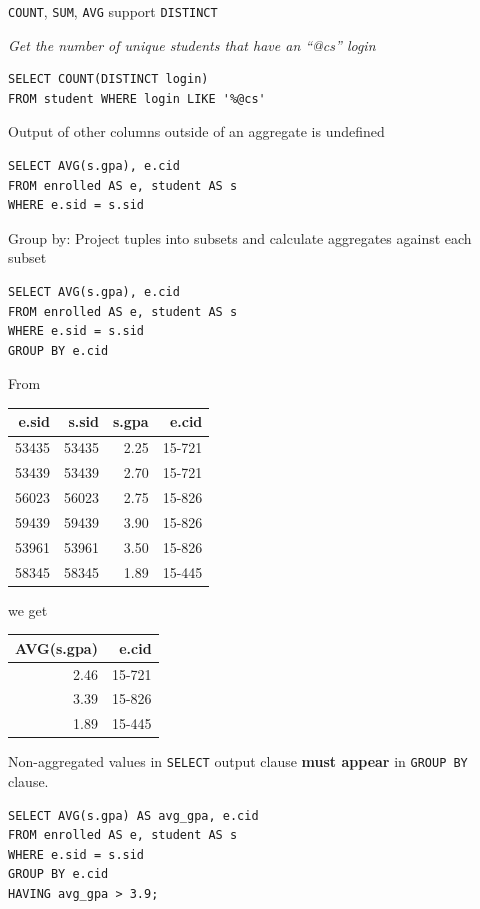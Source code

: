 \documentclass[11pt]{article}
\begin{document}
\texttt{COUNT}, \texttt{SUM}, \texttt{AVG} support \texttt{DISTINCT}

\emph{Get the number of unique students that have an ``@cs'' login}
\begin{verbatim}
SELECT COUNT(DISTINCT login)
FROM student WHERE login LIKE '%@cs'
\end{verbatim}

Output of other columns outside of an aggregate is undefined
\begin{verbatim}
SELECT AVG(s.gpa), e.cid
FROM enrolled AS e, student AS s
WHERE e.sid = s.sid
\end{verbatim}

Group by: Project tuples into subsets and calculate aggregates against each subset
\begin{verbatim}
SELECT AVG(s.gpa), e.cid
FROM enrolled AS e, student AS s
WHERE e.sid = s.sid
GROUP BY e.cid
\end{verbatim}

From
\begin{center}
\begin{tabular}{rrrr}
e.sid & s.sid & s.gpa & e.cid\\
\hline
53435 & 53435 & 2.25 & 15-721\\
53439 & 53439 & 2.70 & 15-721\\
56023 & 56023 & 2.75 & 15-826\\
59439 & 59439 & 3.90 & 15-826\\
53961 & 53961 & 3.50 & 15-826\\
58345 & 58345 & 1.89 & 15-445\\
\end{tabular}
\end{center}
we get
\begin{center}
\begin{tabular}{rr}
AVG(s.gpa) & e.cid\\
\hline
2.46 & 15-721\\
3.39 & 15-826\\
1.89 & 15-445\\
\end{tabular}
\end{center}

Non-aggregated values in \texttt{SELECT} output clause \textbf{must appear} in \texttt{GROUP BY} clause.
\begin{verbatim}
SELECT AVG(s.gpa) AS avg_gpa, e.cid
FROM enrolled AS e, student AS s
WHERE e.sid = s.sid
GROUP BY e.cid
HAVING avg_gpa > 3.9;
\end{verbatim}
\end{document}
